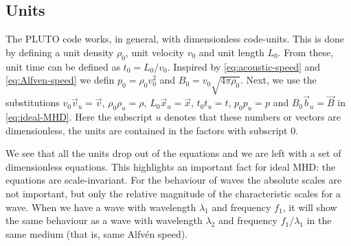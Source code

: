 \subsection{Units}
\label{sec:units}
The PLUTO code works, in general, with dimensionless code-units. This is done by defining a unit density $\rho_0$, unit velocity $v_0$ and unit length $L_0$.
From these, unit time can be defined as $t_0=L_0/v_0$. Inspired by \cref{eq:acoustic-speed} and \cref{eq:Alfven-speed} we defin $p_0=\rho_0v_0^2$ and $B_0=v_0\sqrt{4\pi\rho_0}$.
Next, we use the substitutions $v_0\vec{v}_u=\vec{v}$, $\rho_0\rho_u=\rho$, $L_0\vec{x}_u=\vec{x}$, $t_0t_u=t$, $p_0p_u=p$ and $B_0\vec{b}_u=\vec{B}$ in \cref{eq:ideal-MHD}.
Here the subscript $u$ denotes that these numbers or vectors are dimensionless, the units are contained in the factors with subscript $0$.

{\centering 
\noindent {}
\par}

We see that all the units drop out of the equations and we are left with a set of dimensionless equations.
This highlights an important fact for ideal MHD: the equations are scale-invariant.
For the behaviour of waves the absolute scales are not important, but only the relative magnitude of the characteristic scales for a wave.
When we have a wave with wavelength $\lambda_1$ and frequency $f_1$, it will show the same behaviour as a wave with wavelength $\lambda_2$ and frequency $f_1/\lambda_1$ in the same medium (that is, same Alfvén speed).

